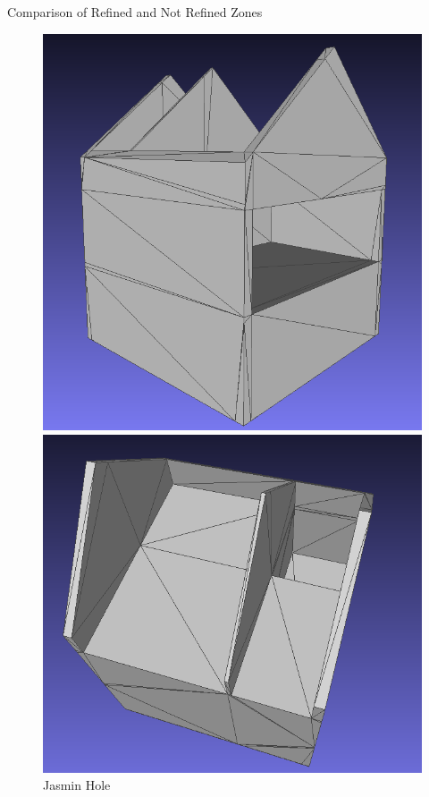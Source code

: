 \documentclass[10pt]{beamer}
\begin{document}
\begin{frame}{Comparison of Refined and Not Refined Zones}
    \begin{figure}
      \centering
      \begin{minipage}[b]{0.40\textwidth}
        \centering
        \includegraphics[width=\textwidth]{../image/ACJAsmin_refine.png}
        \caption{ACJAsmin Refined}
      \end{minipage}\hfill
      \begin{minipage}[b]{0.40\textwidth}
        \centering
        \includegraphics[width=\textwidth]{../image/Jasmin_hole.png}
        \caption{Jasmin Hole}
      \end{minipage}
    
    \end{figure}
\end{frame}
\end{document}
